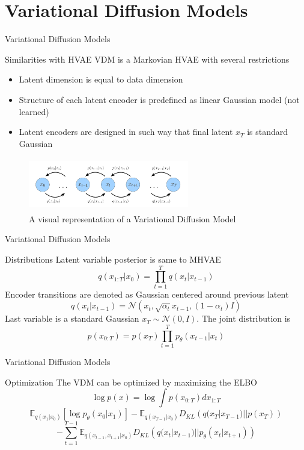 \documentclass{beamer}
\begin{document}
\section{Variational Diffusion Models}
\begin{frame}{Variational Diffusion Models}
    \begin{block}{Similarities with HVAE}
    VDM is a Markovian HVAE with several restrictions
    \begin{itemize}
    \item Latent dimension is equal to data dimension
    \item Structure of each latent encoder is predefined as linear Gaussian model (not learned)
    \item Latent encoders are designed in such way that final latent $x_T$ is standard Gaussian
    \end{itemize}
    \end{block}
    \begin{figure}[h]
        \centering
        \includegraphics[width=7cm, height=2.3cm]{diffusion_3.png}
    \caption{A visual representation of a Variational Diffusion Model}
    \end{figure}
\end{frame}


\begin{frame}{Variational Diffusion Models}
    \begin{block}{Distributions}
    Latent variable posterior is same to MHVAE
    \[q(x_{1:T}|x_0) = \prod_{t=1}^T q(x_t|x_{t-1})\]
    Encoder transitions are denoted as Gaussian centered around previous latent
    \[q(x_t|x_{t-1}) = \mathcal{N}(x_t, \sqrt{\alpha_t}x_{t-1}, (1-\alpha_t)I)\]
    Last variable is a standard Gaussian 
    $x_T \sim \mathcal{N}(0, I)$.
    The joint distribution is
    \[p(x_{0:T}) = p(x_T) \prod_{t=1}^Tp_{\theta}(x_{t-1}|x_t)\]
    \end{block}
\end{frame}

\begin{frame}{Variational Diffusion Models}
    \begin{block}{Optimization}
    The VDM can be optimized by maximizing the ELBO
    \[\log p(x) = \log \int p(x_{0:T}) dx_{1:T}\]
    \[ \mathbb{E}_{q(x_1|x_0)}\left[ \log p_{\theta}(x_0|x_1)\right] - \mathbb{E}_{q(x_{T-1}|x_0)}D_{KL}\left(q(x_T|x_{T-1})||p(x_T)\right)\]
    \[-\sum_{t=1}^{T-1}\mathbb{E}_{q(x_{t-1}, x_{t+1}|x_0)} D_{KL}\left(q(x_t|x_{t-1}) || p_{\theta}(x_t|x_{t+1})\right)\]
    \end{block}
\end{frame}
\end{document}
